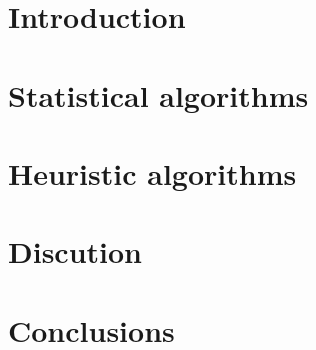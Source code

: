 \documentclass{article}
\title{}
\begin{document}
\graphicspath{{figs/}{data/}}
\maketitle

\begin{abstract}
\end{abstract}

\section{Introduction}
\label{sec:introduction}


\section{Statistical algorithms}
\label{sec:stat-algor}

\section{Heuristic algorithms}
\label{sec:heuristic-algorithms}

\section{Discution}
\label{sec:discution}

\section{Conclusions}
\label{sec:conclusions}


%
%
\end{document}
